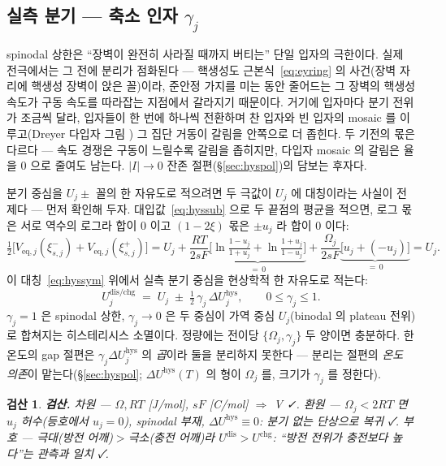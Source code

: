\documentclass[11pt,a4paper]{article}
\newtheorem*{verifybox}{검산}
\newcommand{\eq}{\mathrm{eq}}
\newcommand{\dis}{\mathrm{dis}}
\newcommand{\chg}{\mathrm{chg}}
\newcommand{\hys}{\mathrm{hys}}
\begin{document}
\subsection{실측 분기 — 축소 인자 $\gamma_j$}
spinodal 상한은 ``장벽이 완전히 사라질 때까지 버티는'' 단일 입자의 극한이다. 실제 전극에서는 그 전에
분리가 점화된다 — 핵생성도 근본식~\eqref{eq:eyring} 의 사건(장벽 자리에 핵생성 장벽이 앉은 꼴)이라,
준안정 가지를 미는 동안 줄어드는 그 장벽의 핵생성 속도가 구동 속도를 따라잡는 지점에서 갈라지기 때문이다.
거기에 입자마다 분기 전위가 조금씩 달라, 입자들이 한 번에 하나씩 전환하며 찬 입자와 빈 입자의
mosaic 를 이루고(Dreyer 다입자 그림 \cite{dreyer2010}) 그 집단 거동이 갈림을 안쪽으로 더 좁힌다. 두 기전의 몫은 다르다 — 속도 경쟁은 구동이 느릴수록 갈림을 좁히지만, 다입자
mosaic 의 갈림은 율을 $0$ 으로 줄여도 남는다. $|I|\to0$ 잔존 절편(\S\ref{sec:hyspol})의 담보는
후자다.

분기 중심을 $U_j\pm$ 꼴의 한 자유도로 적으려면 두 극값이 $U_j$ 에 대칭이라는 사실이 전제다 — 먼저
확인해 두자. 대입값~\eqref{eq:hyssub} 으로 두 끝점의 평균을
적으면, 로그 몫은 서로 역수의 로그라 합이 $0$ 이고 $(1-2\xi)$ 몫은 $\pm u_j$ 라 합이 $0$ 이다:
\begin{equation}
\tfrac12\big[V_{\eq,j}(\xi_{s,j}^-)+V_{\eq,j}(\xi_{s,j}^+)\big]
=U_j+\frac{RT}{2sF}
\underbrace{\Big[\ln\tfrac{1-u_j}{1+u_j}+\ln\tfrac{1+u_j}{1-u_j}\Big]}_{=\,0}
+\frac{\Omega_j}{2sF}\underbrace{\big[u_j+(-u_j)\big]}_{=\,0}
=U_j.
\label{eq:hyssym}
\end{equation}
이 대칭~\eqref{eq:hyssym} 위에서 실측 분기 중심을 현상학적 한 자유도로 적는다:
\begin{equation}
U_j^{\dis/\chg}\;=\;U_j\;\pm\;\tfrac12\,\gamma_j\,\Delta U_j^\hys,
\qquad 0\le\gamma_j\le1.
\label{eq:hyscenter}
\end{equation}
$\gamma_j=1$ 은 spinodal 상한, $\gamma_j\to0$ 은 두 중심이 가역 중심 $U_j$(binodal 의 plateau 전위)로
합쳐지는 히스테리시스 소멸이다. 정량에는 전이당 $\{\Omega_j,\gamma_j\}$ 두 양이면 충분하다. 한 온도의 gap
절편은 $\gamma_j\Delta U_j^\hys$ 의 \emph{곱}이라 둘을 분리하지 못한다 — 분리는 절편의 \emph{온도
의존}이 맡는다(\S\ref{sec:hyspol}; $\Delta U^\hys(T)$ 의 형이 $\Omega_j$ 를, 크기가 $\gamma_j$ 를
정한다).

\begin{verifybox}
\textbf{검산.} 차원 — $\Omega,RT$ [J/mol], $sF$ [C/mol] $\Rightarrow$ V ✓. 환원 — $\Omega_j<2RT$ 면
$u_j$ 허수(등호에서 $u_j=0$), spinodal 부재, $\Delta U^\hys\equiv0$: 분기 없는 단상으로 복귀 ✓. 부호 — 극대(방전
어깨)$>$극소(충전 어깨)라 $U^{\dis}>U^{\chg}$: ``방전 전위가 충전보다 높다''는 관측과 일치 ✓.
\end{verifybox}
\end{document}
